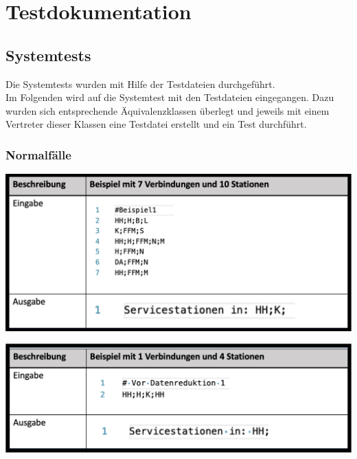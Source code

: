 \chapter{Testdokumentation}\label{ch:testdokumentation}

\section{Systemtests}\label{test:sec:systemtests}
Die Systemtests wurden mit Hilfe der Testdateien durchgeführt.\\
Im Folgenden wird auf die Systemtest mit den Testdateien eingegangen. Dazu wurden sich entsprechende Äquivalenzklassen überlegt und jeweils mit einem Vertreter dieser Klassen eine Testdatei erstellt und ein Test durchführt.\\
\subsection{Normalfälle}\label{test:sec:normalfaelle}
\begin{center}
    \includegraphics[width=\linewidth]{images/Tests/IHK-Beispiele/Beispiel1.png}
    \label{test:subsecpar:beispiel1}
\end{center}

\begin{center}
    \includegraphics[width=\linewidth]{images/Tests/IHK-Beispiele/Datenreduktion1.png}
    \label{test:subsecpar:Datenreduktion1}
\end{center}

